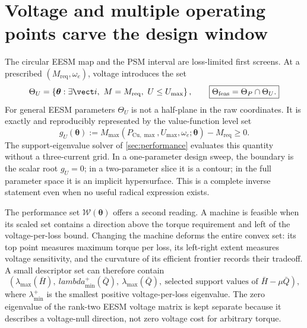 \section{Voltage and multiple operating points carve the design window}
\label{sec:voltage-design}

The circular EESM map and the PSM interval are loss-limited first screens.
At a prescribed \((M_{\mathrm{req}},\omega_e)\), voltage introduces the set
\begin{equation}
 \Theta_U=\left\{\boldsymbol\theta:\exists\vect i,
 \ M=M_{\mathrm{req}},\ U\leq U_{\max}\right\},
 \qquad
 \boxed{\Theta_{\mathrm{feas}}=\Theta_P\cap\Theta_U.}
 \label{eq:loss-voltage-design-intersection}
\end{equation}
For general EESM parameters \(\Theta_U\) is not a half-plane in the raw
coordinates.  It is exactly and reproducibly represented by the value-function
level set
\begin{equation}
 g_U(\boldsymbol\theta):=
 M_{\max}(P_{\mathrm{Cu},\max},U_{\max},\omega_e;
 \boldsymbol\theta)-M_{\mathrm{req}}\geq0.
 \label{eq:voltage-design-levelset}
\end{equation}
The support-eigenvalue solver of \cref{sec:performance} evaluates this
quantity without a three-current grid.  In a one-parameter design sweep, the
boundary is the scalar root \(g_U=0\); in a two-parameter slice it is a contour;
in the full parameter space it is an implicit hypersurface.  This is a complete
inverse statement even when no useful radical expression exists.

The performance set \(\mathcal W(\boldsymbol\theta)\) offers a second reading.
A machine is feasible when its scaled set contains a direction above the
torque requirement and left of the voltage-per-loss bound.  Changing the
machine deforms the entire convex set: its top point measures maximum torque
per loss, its left-right extent measures voltage sensitivity, and the curvature
of its efficient frontier records their tradeoff.  A small descriptor set can
therefore contain
\begin{equation}
 \left(\lambda_{\max}(\bar H),\ lambda_{\min}^{+}(\bar Q),\
 \lambda_{\max}(\bar Q),\ \text{selected support values of }
 \bar H-\mu\bar Q\right),
 \label{eq:machine-fingerprint}
\end{equation}
where \(\lambda_{\min}^{+}\) is the smallest positive voltage-per-loss
eigenvalue.  The zero eigenvalue of the rank-two EESM voltage matrix is kept
separate because it describes a voltage-null direction, not zero voltage cost
for arbitrary torque.


